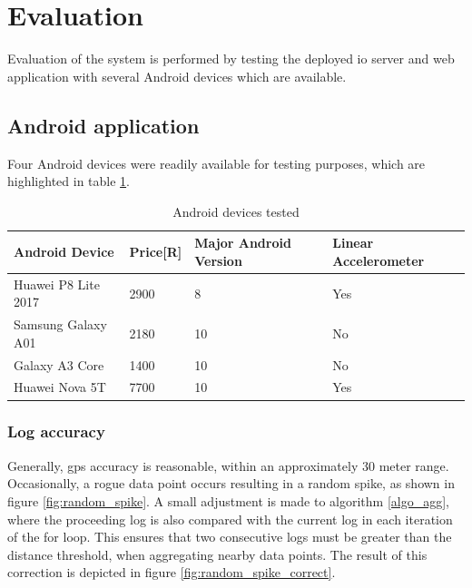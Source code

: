 \section{Evaluation}
Evaluation of the system is performed by testing the deployed \ac{io} server and web application with several Android devices which are available.

\subsection{Android application}
Four Android devices were readily available for testing purposes, which are highlighted in table \ref{tab:android_devices_tested}.

\begin{table}[H]
\caption{Android devices tested}
\label{tab:android_devices_tested}
\begin{tabular}{llll}
\hline
Android Device      & Price[R]  & Major Android Version & Linear Accelerometer \\ \hline
Huawei P8 Lite 2017 & 2900     & 8                     & Yes                  \\
Samsung Galaxy A01  & 2180     & 10                    & No                   \\
Galaxy A3 Core      & 1400     & 10                    & No                   \\
Huawei Nova 5T      & 7700     & 10                    & Yes                  \\ \hline
\end{tabular}
\end{table}

\subsubsection{Log accuracy}
Generally, \ac{gps} accuracy is reasonable, within an approximately 30 meter range.
Occasionally, a rogue data point occurs resulting in a random spike, as shown in figure \ref{fig:random_spike}.
A small adjustment is made to algorithm \ref{algo_agg}, where the proceeding log is also compared with the current log in each iteration of the for loop.
This ensures that two consecutive logs must be greater than the distance threshold, when aggregating nearby data points.
The result of this correction is depicted in figure \ref{fig:random_spike_correct}.

